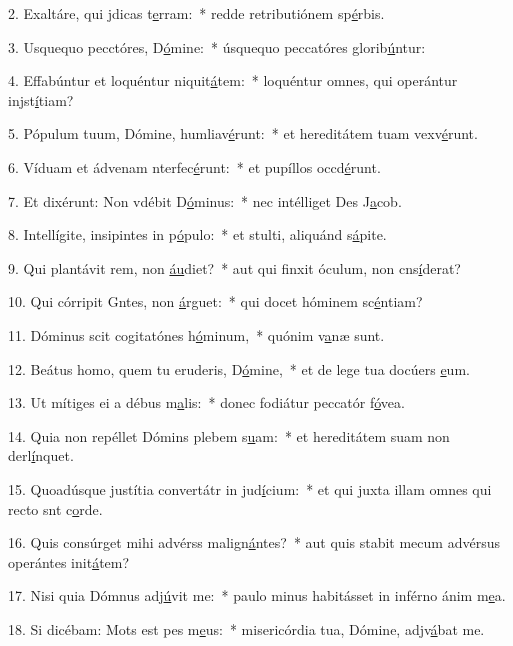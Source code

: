 2. Exaltáre, qui jdicas t\uline{e}rram:~* redde retributiónem sp\uline{é}rbis.\par 
3. Usquequo pecctóres, D\uline{ó}mine:~* úsquequo peccatóres glorib\uline{ú}ntur:\par 
4. Effabúntur et loquéntur niquit\uline{á}tem:~* loquéntur omnes, qui operántur injst\uline{í}tiam?\par 
5. Pópulum tuum, Dómine, humliav\uline{é}runt:~* et hereditátem tuam vexv\uline{é}runt.\par 
6. Víduam et ádvenam nterfec\uline{é}runt:~* et pupíllos occd\uline{é}runt.\par 
7. Et dixérunt: Non vdébit D\uline{ó}minus:~* nec intélliget Des J\uline{a}cob.\par 
8. Intellígite, insipintes in p\uline{ó}pulo:~* et stulti, aliquánd s\uline{á}pite.\par 
9. Qui plantávit rem, non \uline{áu}diet?~* aut qui finxit óculum, non cns\uline{í}derat?\par 
10. Qui córripit Gntes, non \uline{á}rguet:~* qui docet hóminem sc\uline{é}ntiam?\par 
11. Dóminus scit cogitatónes h\uline{ó}minum,~* quónim v\uline{a}næ sunt.\par 
12. Beátus homo, quem tu eruderis, D\uline{ó}mine,~* et de lege tua docúers \uline{e}um.\par 
13. Ut mítiges ei a débus m\uline{a}lis:~* donec fodiátur peccatór f\uline{ó}vea.\par 
14. Quia non repéllet Dómins plebem s\uline{u}am:~* et hereditátem suam non derl\uline{í}nquet.\par 
15. Quoadúsque justítia convertátr in jud\uline{í}cium:~* et qui juxta illam omnes qui recto snt c\uline{o}rde.\par 
16. Quis consúrget mihi advérss malign\uline{á}ntes?~* aut quis stabit mecum advérsus operántes init\uline{á}tem?\par 
17. Nisi quia Dómnus adj\uline{ú}vit me:~* paulo minus habitásset in inférno ánim m\uline{e}a.\par 
18. Si dicébam: Mots est pes m\uline{e}us:~* misericórdia tua, Dómine, adjv\uline{á}bat me.\par 
